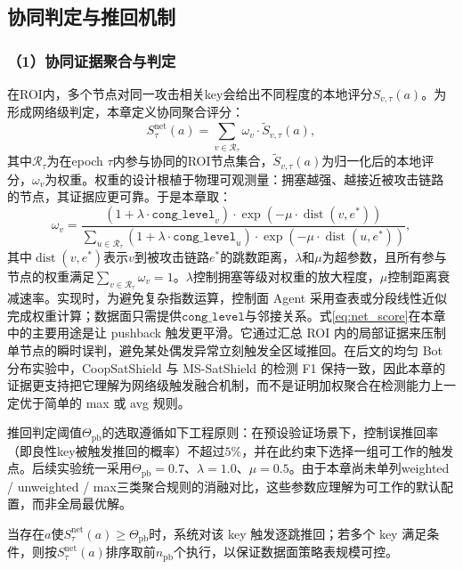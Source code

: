 \subsection{协同判定与推回机制}
\label{subsec:ch4_pushback}

\subsubsection*{（1）协同证据聚合与判定}
在ROI内，多个节点对同一攻击相关key会给出不同程度的本地评分$S_{v,\tau}(a)$。为形成网络级判定，本章定义协同聚合评分：
\begin{equation}
S^{\text{net}}_{\tau}(a) = \sum_{v\in \mathcal{R}_{\tau}}\omega_v \cdot \widetilde{S}_{v,\tau}(a),
\label{eq:net_score}
\end{equation}
其中$\mathcal{R}_{\tau}$为在epoch $\tau$内参与协同的ROI节点集合，$\widetilde{S}_{v,\tau}(a)$为归一化后的本地评分，$\omega_v$为权重。权重的设计根植于物理可观测量：拥塞越强、越接近被攻击链路的节点，其证据应更可靠。于是本章取：
\begin{equation}
\omega_v = \frac{\left(1+\lambda\cdot \texttt{cong\_level}_v\right)\cdot \exp\!\left(-\mu\cdot \operatorname{dist}(v,e^\ast)\right)}{\sum_{u\in\mathcal{R}_\tau}\left(1+\lambda\cdot \texttt{cong\_level}_u\right)\cdot \exp\!\left(-\mu\cdot \operatorname{dist}(u,e^\ast)\right)},
\label{eq:weight}
\end{equation}
其中$\operatorname{dist}(v,e^\ast)$表示$v$到被攻击链路$e^\ast$的跳数距离，$\lambda$和$\mu$为超参数，且所有参与节点的权重满足$\sum_{v\in\mathcal{R}_\tau}\omega_v = 1$。$\lambda$控制拥塞等级对权重的放大程度，$\mu$控制距离衰减速率。实现时，为避免复杂指数运算，控制面 Agent 采用查表或分段线性近似完成权重计算；数据面只需提供$\texttt{cong\_level}$与邻接关系。式\eqref{eq:net_score}在本章中的主要用途是让 pushback 触发更平滑。它通过汇总 ROI 内的局部证据来压制单节点的瞬时误判，避免某处偶发异常立刻触发全区域推回。在后文的均匀 Bot 分布实验中，CoopSatShield 与 MS-SatShield 的检测 F1 保持一致，因此本章的证据更支持把它理解为网络级触发融合机制，而不是证明加权聚合在检测能力上一定优于简单的 max 或 avg 规则。

推回判定阈值$\Theta_{\text{pb}}$的选取遵循如下工程原则：在预设验证场景下，控制误推回率（即良性key被触发推回的概率）不超过$5\%$，并在此约束下选择一组可工作的触发点。后续实验统一采用$\Theta_{\text{pb}}=0.7$、$\lambda=1.0$、$\mu=0.5$。由于本章尚未单列weighted / unweighted / max三类聚合规则的消融对比，这些参数应理解为可工作的默认配置，而非全局最优解。

当存在$a$使$S^{\text{net}}_{\tau}(a)\ge \Theta_{\text{pb}}$时，系统对该 key 触发逐跳推回；若多个 key 满足条件，则按$S^{\text{net}}_{\tau}(a)$排序取前$n_{\text{pb}}$个执行，以保证数据面策略表规模可控。


